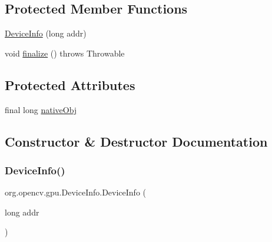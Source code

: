 \subsection*{Protected Member Functions}
\begin{DoxyCompactItemize}
\item 
\mbox{\hyperlink{classorg_1_1opencv_1_1gpu_1_1_device_info_aecb4caeb445a8ae92a26a8184eb9c2a2}{Device\+Info}} (long addr)
\item 
void \mbox{\hyperlink{classorg_1_1opencv_1_1gpu_1_1_device_info_a5a3607ba11b9a764e5dbfcecfb1a31f4}{finalize}} ()  throws Throwable 
\end{DoxyCompactItemize}
\subsection*{Protected Attributes}
\begin{DoxyCompactItemize}
\item 
final long \mbox{\hyperlink{classorg_1_1opencv_1_1gpu_1_1_device_info_adbba58be44059ebfb3dd8b0659660df9}{native\+Obj}}
\end{DoxyCompactItemize}


\subsection{Constructor \& Destructor Documentation}
\mbox{\label{classorg_1_1opencv_1_1gpu_1_1_device_info_aecb4caeb445a8ae92a26a8184eb9c2a2}} 
\subsubsection{\texorpdfstring{Device\+Info()}{DeviceInfo()}\hspace{0.1cm}{\footnotesize\ttfamily [1/3]}}
{\footnotesize\ttfamily org.\+opencv.\+gpu.\+Device\+Info.\+Device\+Info (\begin{DoxyParamCaption}\item[{long}]{addr }\end{DoxyParamCaption})\hspace{0.3cm}{\ttfamily [protected]}}

\mbox{\label{classorg_1_1opencv_1_1gpu_1_1_device_info_a5cb436ba938d39a75e2c733b66d1153e}} 
